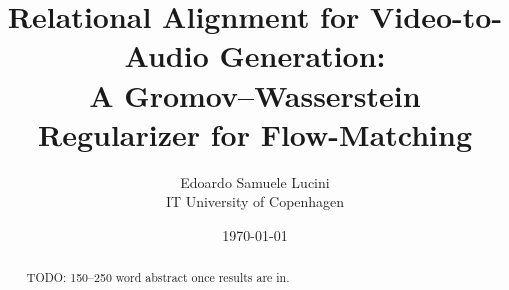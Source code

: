 \documentclass[11pt]{article}
\title{Relational Alignment for Video-to-Audio Generation:\\
       A Gromov--Wasserstein Regularizer for Flow-Matching}
\author{Edoardo Samuele Lucini\\IT University of Copenhagen}
\date{\today}
\begin{document}
\maketitle

\begin{abstract}
TODO: 150--250 word abstract once results are in.
\end{abstract}









\end{document}
